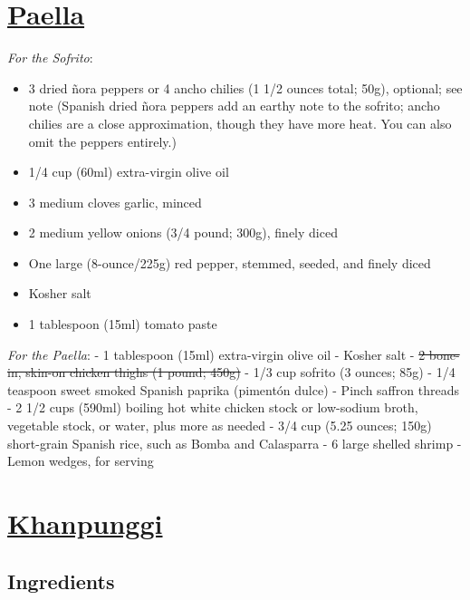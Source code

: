 \documentclass[
]{article}
\providecommand{\tightlist}{%
  \setlength{\itemsep}{0pt}\setlength{\parskip}{0pt}}
\begin{document}
\hypertarget{paella}{%
\section{\texorpdfstring{\href{https://www.seriouseats.com/recipes/2019/09/stovetop-paella-mixta-for-two-with-chicken-and-shrimp.html}{Paella}}{Paella}}\label{paella}}

\emph{For the Sofrito}:

\begin{itemize}
\tightlist
\item
  3 dried ñora peppers or 4 ancho chilies (1 1/2 ounces total; 50g), optional; see note (Spanish dried ñora peppers add an earthy note to the sofrito; ancho chilies are a close approximation, though they have more heat. You can also omit the peppers entirely.)
\item
  1/4 cup (60ml) extra-virgin olive oil
\item
  3 medium cloves garlic, minced
\item
  2 medium yellow onions (3/4 pound; 300g), finely diced
\item
  One large (8-ounce/225g) red pepper, stemmed, seeded, and finely diced
\item
  Kosher salt
\item
  1 tablespoon (15ml) tomato paste
\end{itemize}

\emph{For the Paella}:
- 1 tablespoon (15ml) extra-virgin olive oil
- Kosher salt
- \sout{2 bone-in, skin-on chicken thighs (1 pound; 450g)}
- 1/3 cup sofrito (3 ounces; 85g)
- 1/4 teaspoon sweet smoked Spanish paprika (pimentón dulce)
- Pinch saffron threads
- 2 1/2 cups (590ml) boiling hot white chicken stock or low-sodium broth, vegetable stock, or water, plus more as needed
- 3/4 cup (5.25 ounces; 150g) short-grain Spanish rice, such as Bomba and Calasparra
- 6 large shelled shrimp
- Lemon wedges, for serving

\hypertarget{khanpunggi}{%
\section{\texorpdfstring{\href{https://www.maangchi.com/recipe/kkanpunggi/comment-page-3}{Khanpunggi}}{Khanpunggi}}\label{khanpunggi}}

\hypertarget{ingredients}{%
\subsection{Ingredients}\label{ingredients}}
\end{document}
